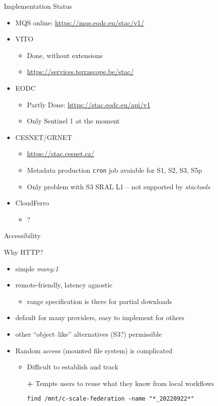 \documentclass[c,aspectratio=169,14pt]{beamer}
\begin{document}
\begin{frame}{Implementation Status}
\begin{itemize}
\item MQS online: \url{https://mqs.eodc.eu/stac/v1/}
\item VITO
\begin{itemize}
	\item Done, without extensions
	\item \url{https://services.terrascope.be/stac/}
\end{itemize}
\item EODC
\begin{itemize}
	\item Partly Done: \url{https://stac.eodc.eu/api/v1}
	\item Only Sentinel 1 at the moment
\end{itemize}
\item CESNET/GRNET
\begin{itemize}
	\item \url{https://stac.cesnet.cz/}
	\item Metadata production \texttt{cron} job avaiable for S1, S2, S3, S5p
	\item Only problem with S3 SRAL L1 -- not supported by \textit{stactools}
\end{itemize}
\item CloudFerro
\begin{itemize}
	\item ?
\end{itemize}
\end{itemize}

\end{frame}



\begin{frame}{Accessibility}

Why HTTP?
\begin{itemize}
\item simple \emph{many:1}
\item remote-friendly, latency agnostic
\begin{itemize}
\item range specification is there for partial downloads
\end{itemize}
\item default for many providers, easy to implement for others
\item other ``object--like'' alternatives (S3?) permissible
\item Random access (mounted file system) is complicated
\begin{itemize}
\item Difficult to establish and track
\item[\textbf{+}] Tempts users to reuse what they know from local workflows\par\smallskip \texttt{find /mnt/c-scale-federation -name "*\_20220922*"}
\end{itemize}
\end{itemize}
\end{frame}
\end{document}
